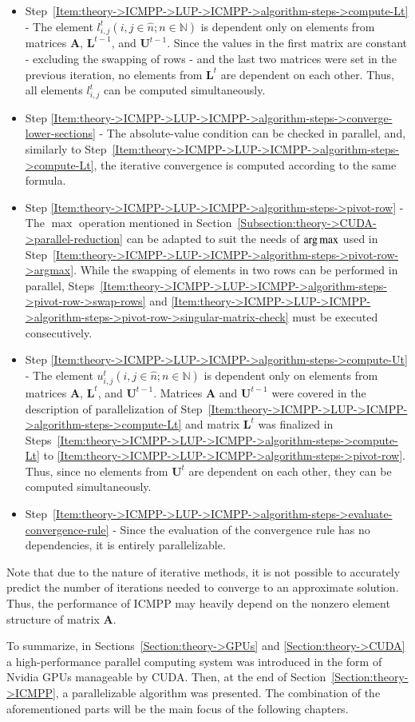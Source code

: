 \begin{itemize}
	\item Step~\ref{Item:theory->ICMPP->LUP->ICMPP->algorithm-steps->compute-Lt} - The element $l^{t}_{i,j} \left(i, j \in \widehat{n}; n \in \mathbb{N}\right)$ is dependent only on elements from matrices $\mathbf{A}$, $\mathbf{L}^{t-1}$, and $\mathbf{U}^{t-1}$.
Since the values in the first matrix are constant - excluding the swapping of rows - and the last two matrices were set in the previous iteration, no elements from $\mathbf{L}^{t}$ are dependent on each other.
Thus, all elements $l^{t}_{i,j}$ can be computed simultaneously.
	\item Step \ref{Item:theory->ICMPP->LUP->ICMPP->algorithm-steps->converge-lower-sections} - The absolute-value condition can be checked in parallel, and, similarly to Step~\ref{Item:theory->ICMPP->LUP->ICMPP->algorithm-steps->compute-Lt}, the iterative convergence is computed according to the same formula.
	\item Step \ref{Item:theory->ICMPP->LUP->ICMPP->algorithm-steps->pivot-row} - The $\max$ operation mentioned in Section~\ref{Subsection:theory->CUDA->parallel-reduction} can be adapted to suit the needs of $\operatorname*{arg\,max}$ used in Step~\ref{Item:theory->ICMPP->LUP->ICMPP->algorithm-steps->pivot-row->argmax}.
While the swapping of elements in two rows can be performed in parallel, Steps~\ref{Item:theory->ICMPP->LUP->ICMPP->algorithm-steps->pivot-row->swap-rows} and \ref{Item:theory->ICMPP->LUP->ICMPP->algorithm-steps->pivot-row->singular-matrix-check} must be executed consecutively.
	\item Step \ref{Item:theory->ICMPP->LUP->ICMPP->algorithm-steps->compute-Ut} - The element $u^{t}_{i,j} \left(i, j \in \widehat{n}; n \in \mathbb{N}\right)$ is dependent only on elements from matrices $\mathbf{A}$, $\mathbf{L}^{t}$, and $\mathbf{U}^{t-1}$.
Matrices $\mathbf{A}$ and $\mathbf{U}^{t-1}$ were covered in the description of parallelization of Step~\ref{Item:theory->ICMPP->LUP->ICMPP->algorithm-steps->compute-Lt} and matrix $\mathbf{L}^{t}$ was finalized in Steps~\ref{Item:theory->ICMPP->LUP->ICMPP->algorithm-steps->compute-Lt} to \ref{Item:theory->ICMPP->LUP->ICMPP->algorithm-steps->pivot-row}.
Thus, since no elements from $\mathbf{U}^{t}$ are dependent on each other, they can be computed simultaneously.
	\item Step~\ref{Item:theory->ICMPP->LUP->ICMPP->algorithm-steps->evaluate-convergence-rule} - Since the evaluation of the convergence rule has no dependencies, it is entirely parallelizable.
\end{itemize}

Note that due to the nature of iterative methods, it is not possible to accurately predict the number of iterations needed to converge to an approximate solution.
Thus, the performance of ICMPP may heavily depend on the nonzero element structure of matrix $\mathbf{A}$.

To summarize, in Sections~\ref{Section:theory->GPUs} and \ref{Section:theory->CUDA} a high-performance parallel computing system was introduced in the form of Nvidia GPUs manageable by CUDA.
Then, at the end of Section~\ref{Section:theory->ICMPP}, a parallelizable algorithm was presented.
The combination of the aforementioned parts will be the main focus of the following chapters.